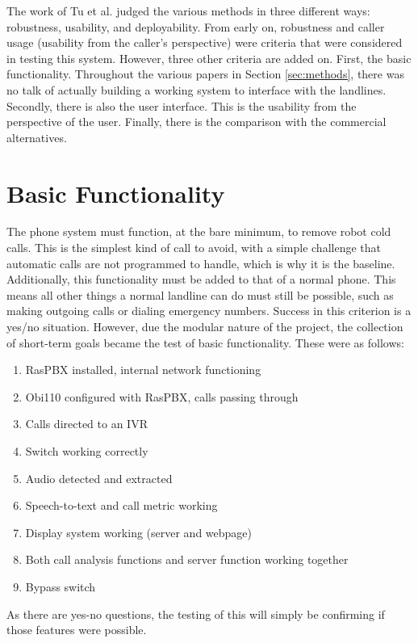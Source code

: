 \documentclass[main.tex]{subfiles}
\begin{document}
The work of Tu et al. \cite{cisco} judged the various methods in three different ways: robustness, usability, and deployability. From early on, robustness and caller usage (usability from the caller's perspective) were criteria that were considered in testing this system. However, three other criteria are added on. First, the basic functionality. Throughout the various papers in Section \ref{sec:methods}, there was no talk of actually building a working system to interface with the landlines. Secondly, there is also the user interface. This is the usability from the perspective of the user. Finally, there is the comparison with the commercial alternatives.

\section{Basic Functionality}
The phone system must function, at the bare minimum, to remove robot cold calls. This is the simplest kind of call to avoid, with a simple challenge that automatic calls are not programmed to handle, which is why it is the baseline. Additionally, this functionality must be added to that of a normal phone. This means all other things a normal landline can do must still be possible, such as making outgoing calls or dialing emergency numbers. Success in this criterion is a yes/no situation. However, due the modular nature of the project, the collection of short-term goals became the test of basic functionality. These were as follows:

\begin{enumerate}
	\item RasPBX installed, internal network functioning
	\item Obi110 configured with RasPBX, calls passing through
	\item Calls directed to an IVR
	\item Switch working correctly
	\item Audio detected and extracted
	\item Speech-to-text and call metric working
	\item Display system working (server and webpage)
	\item Both call analysis functions and server function working together
	\item Bypass switch
\end{enumerate}

As there are yes-no questions, the testing of this will simply be confirming if those features were possible.
\end{document}
